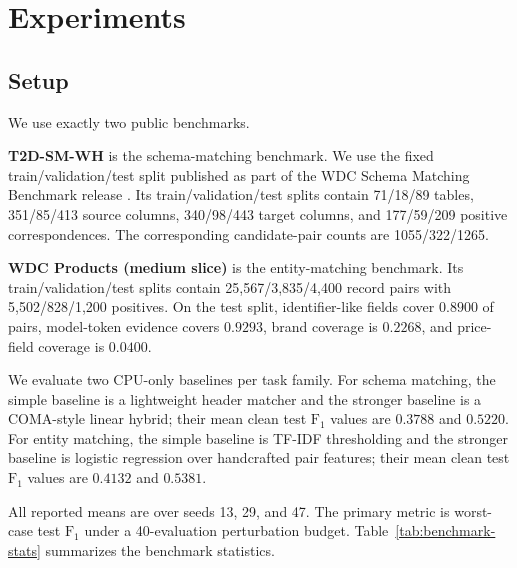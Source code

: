 \documentclass{article}
\newcommand{\fonescore}{\ensuremath{\mathrm{F}_{1}}}
\begin{document}
\section{Experiments}
\label{sec:experiments}
\subsection{Setup}
We use exactly two public benchmarks.

\textbf{T2D-SM-WH} is the schema-matching benchmark. We use the fixed train/validation/test split published as part of the WDC Schema Matching Benchmark release \citep{der2023wdcsmb}. Its train/validation/test splits contain 71/18/89 tables, 351/85/413 source columns, 340/98/443 target columns, and 177/59/209 positive correspondences. The corresponding candidate-pair counts are 1055/322/1265.

\textbf{WDC Products (medium slice)} is the entity-matching benchmark. Its train/validation/test splits contain 25{,}567/3{,}835/4{,}400 record pairs with 5{,}502/828/1{,}200 positives. On the test split, identifier-like fields cover $0.8900$ of pairs, model-token evidence covers $0.9293$, brand coverage is $0.2268$, and price-field coverage is $0.0400$.

We evaluate two CPU-only baselines per task family. For schema matching, the simple baseline is a lightweight header matcher and the stronger baseline is a COMA-style linear hybrid; their mean clean test \fonescore{} values are $0.3788$ and $0.5220$. For entity matching, the simple baseline is TF-IDF thresholding and the stronger baseline is logistic regression over handcrafted pair features; their mean clean test \fonescore{} values are $0.4132$ and $0.5381$.

All reported means are over seeds 13, 29, and 47. The primary metric is worst-case test \fonescore{} under a 40-evaluation perturbation budget. Table~\ref{tab:benchmark-stats} summarizes the benchmark statistics.
\end{document}
